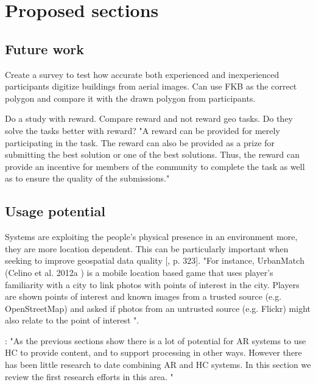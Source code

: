 \chapter{Proposed sections}

\section{Future work}

Create a survey to test how accurate both experienced and inexperienced participants digitize buildings from aerial images. Can use FKB as the correct polygon and compare it with the drawn polygon from participants. 

Do a study with reward. Compare reward and not reward geo tasks. Do they solve the tasks better with reward? "A reward can be provided for merely participating in the task. The reward can also be provided as a prize for submitting the best solution or one of the best solutions. Thus, the reward can provide an incentive for members of the community to complete the task as well as to ensure the quality of the submissions."  %

\section{Usage potential}
Systems are exploiting the people's physical presence in an environment more, they are more location dependent. This can be particularly important when seeking to improve geospatial data quality [\citep{Meier2013}, p. 323]. "For instance, UrbanMatch (Celino et al. 2012a ) is a mobile location based game that uses player’s familiarity with a city to link photos with points of interest in the city. Players are shown points of interest and known images from a trusted source (e.g. OpenStreetMap) and asked if photos from an untrusted source (e.g. Flickr) might also relate to the point of interest ".  

\citep{Meier2013}:  "As the previous sections show there is a lot of potential for AR systems to use HC to provide content, and to support processing in other ways. However there has been
little research to date combining AR and HC systems. In this section we review the first research efforts in this area. " 

